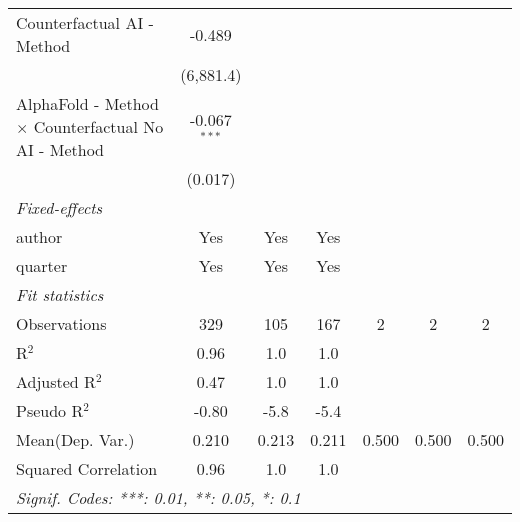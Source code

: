 \begin{tabular}{lcccccc}
   Counterfactual AI - Method                                 & -0.489         &                &               &     &     &   \\   
                                                              & (6,881.4)      &                &               &     &     &   \\   
   AlphaFold - Method $\times$ Counterfactual No AI - Method  & -0.067$^{***}$ &                &               &     &     &   \\   
                                                              & (0.017)        &                &               &     &     &   \\   
   \midrule
   \emph{Fixed-effects}\\
   author                                                     & Yes            & Yes            & Yes           &     &     & \\  
   quarter                                                    & Yes            & Yes            & Yes           &     &     & \\  
   \midrule
   \emph{Fit statistics}\\
   Observations                                               & 329            & 105            & 167           & 2   & 2   & 2\\  
   R$^2$                                                      & 0.96           & 1.0            & 1.0           &     &     & \\  
   Adjusted R$^2$                                             & 0.47           & 1.0            & 1.0           &     &     & \\  
   Pseudo R$^2$                                               & -0.80          & -5.8           & -5.4          &     &     & \\  
Mean(Dep. Var.) & 0.210 & 0.213 & 0.211 & 0.500 & 0.500 & 0.500 \\
   Squared Correlation                                        & 0.96           & 1.0            & 1.0           &     &     & \\  
   \midrule \midrule
   \multicolumn{7}{l}{\emph{Signif. Codes: ***: 0.01, **: 0.05, *: 0.1}}\\
\end{tabular}
\par\endgroup
